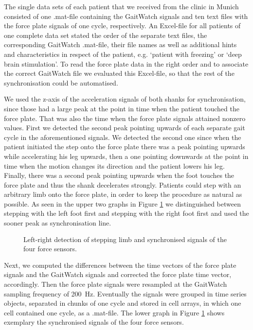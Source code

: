 The single data sets of each patient that we received from the clinic in Munich consisted of one .mat-file containing the GaitWatch signals and ten text files with the force plate signals of one cycle, respectively. An Excel-file for all patients of one complete data set stated the order of the separate text files, the corresponding GaitWatch .mat-file, their file names as well as additional hints and characteristics in respect of the patient, e.g. `patient with freezing' or `deep brain stimulation'. To read the force plate data in the right order and to associate the correct GaitWatch file we evaluated this Excel-file, so that the rest of the synchronisation could be automatised.

We used the z-axis of the acceleration signals of both shanks for synchronisation, since those had a large peak at the point in time when the patient touched the force plate. That was also the time when the force plate signals attained nonzero values.  First we detected the second peak pointing upwards of each separate gait cycle in the aforementioned signals. We detected the second one since when the patient initiated the step onto the force plate there was a peak pointing upwards while accelerating his leg upwards, then a one pointing downwards at the point in time when the motion changes its direction and the patient lowers his leg. Finally, there was a second peak pointing upwards when the foot touches the force plate and thus the shank decelerates strongly. Patients could step with an arbitrary limb onto the force plate, in order to keep the procedure as natural as possible. As seen in the upper two graphs in Figure \ref{fig:left_right_detect} we distinguished between stepping with the left foot first and stepping with the right foot first and used the sooner peak as synchronisation line. 
\begin{figure}
	\centering
	\caption{Left-right detection of stepping limb and synchronised signals of the four force sensors.}
	\label{fig:left_right_detect}
\end{figure}

  Next, we computed the differences between the time vectors of the force plate signals and the GaitWatch signals and corrected the force plate time vector, accordingly. Then the force plate signals were resampled at the GaitWatch sampling frequency of \mbox{200 Hz}. Eventually the signals were grouped in time series objects, separated in chunks of one cycle and stored in cell arrays, in which one cell contained one cycle, as a .mat-file. The lower graph in Figure \ref{fig:left_right_detect} shows exemplary the synchronised signals of the four force sensors. 

